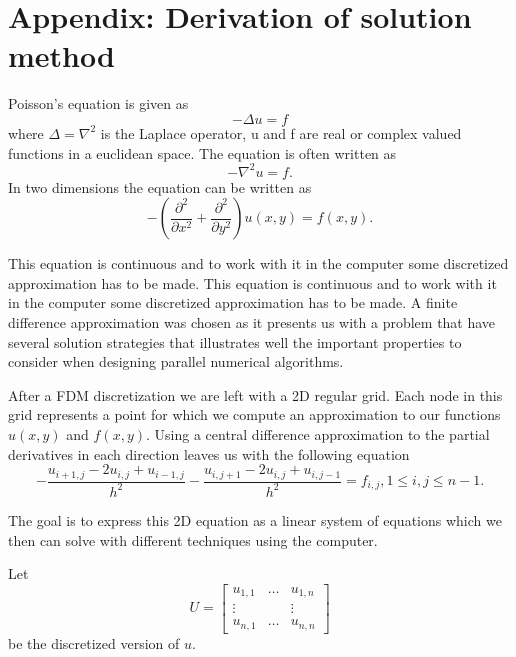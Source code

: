\documentclass{article}
\newcommand{\dd}[2]{\ensuremath{\frac{\partial^2 #1}{\partial #2^2}}}
\begin{document}
\section{Appendix: Derivation of solution method}
\label{sec:math_der}
Poisson's equation is given as
\[
-\Delta u = f
\]
where $\Delta = \nabla^2$ is the Laplace operator, u and f are real or complex valued functions in a
euclidean space. The equation is often written as
\[
-\nabla^2 u = f.
\]
In two dimensions the equation can be written as
\[
-\left( \dd{}{x} + \dd{}{y}\right) u(x,y) = f(x,y).
\]

This equation is continuous and to work with it in the computer some discretized approximation has
to be made. This equation is continuous and to work with it in the computer some discretized approximation has to be made. A finite difference approximation was chosen as it presents us with a
problem that have several solution strategies that illustrates well the important properties to
consider when designing parallel numerical algorithms.

After a FDM discretization we are left with a 2D regular grid. Each node in this grid represents
a point for which we compute an approximation to our functions $u(x,y)$ and $f(x,y)$.
Using a central difference approximation to the partial derivatives in each direction leaves us
with the following equation
\[
-\frac{u_{i+1,j}-2u_{i,j}+u_{i-1,j}}{h^2} - \frac{u_{i,j+1}-2u_{i,j}+u_{i,j-1}}{h^2} = f_{i,j}, 1\leq i,j \leq n-1.
\]

The goal is to express this 2D equation as a linear system of equations which we then can solve with
different techniques using the computer.

Let
\begin{equation}
       U = \begin{bmatrix}
               u_{1,1} & \dots & u_{1,n} \\
               \vdots  &       & \vdots \\
               u_{n,1} & \dots & u_{n,n}
       \end{bmatrix}
\end{equation}
be the discretized version of $u$.
\end{document}

